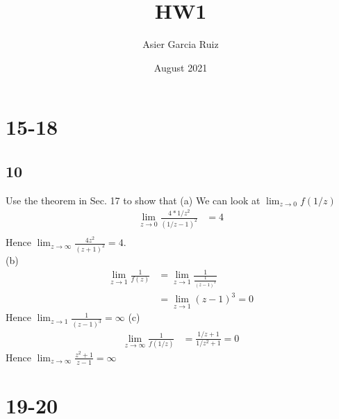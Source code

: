 \documentclass{article}
\title{HW1}
\author{Asier Garcia Ruiz }
\date{August 2021}
\newcommand{\ra}{\xrightarrow{}}
\begin{document}
    \maketitle
    \section*{15-18}
    \subsection*{10}
    Use the theorem in Sec. 17 to show that
    (a) We can look at $\lim_{z \ra 0}f(1/z)$
    \begin{align*}
        \lim_{z\ra 0} \frac{4*1/z^2}{(1/z - 1)^2} &= 4 \\
    \end{align*}
    Hence $\lim_{z\ra\infty}\frac{4z^2}{(z+1)^2} = 4$. \\
    (b) \begin{align*}
        \lim_{z\ra 1} \frac{1}{f(z)} &= \lim_{z\ra 1} \frac{1}{\frac{1}{(z-1)^3}} \\
            &= \lim_{z\ra 1} (z-1)^3 = 0
    \end{align*}
    Hence $\lim_{z\ra 1} \frac{1}{(z-1)^3} = \infty$
    (c) \begin{align*}
        \lim_{z\ra\infty} \frac{1}{f(1/z)} &= \frac{1/z + 1}{1/z^2 + 1} = 0
    \end{align*}
    Hence $\lim_{z\ra\infty}\frac{z^2 + 1}{z - 1} = \infty$
    \section*{19-20}
\end{document}

